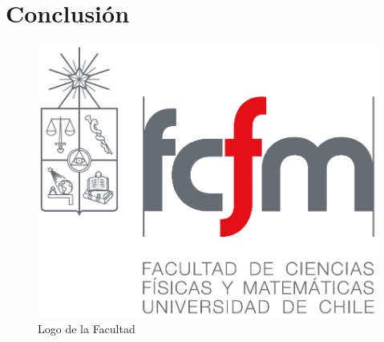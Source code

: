 \chapter{Conclusión}

\lipsum[130-132]
\begin{figure}
	\centering
	\includegraphics[scale=.2]{imagenes/fcfm.pdf}
	\caption{Logo de la Facultad}
	\label{logofcfm}
\end{figure}

\lipsum[133-134]


